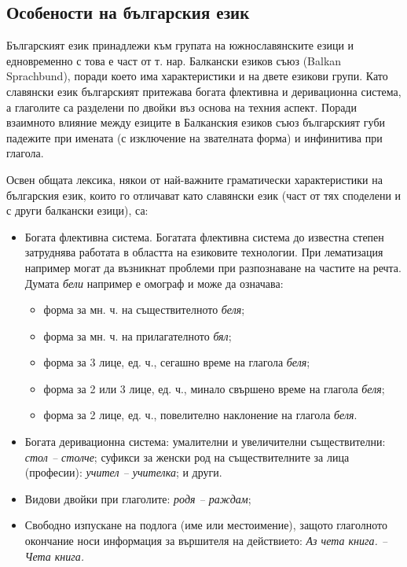\documentclass[]{../../metanetpaper}
\begin{document}
\begin{multicols}{2}
\subsection{Особености на българския език}

Българският език принадлежи към групата на южнославянските езици и едновременно с това е част от
 т. нар. Балкански езиков съюз (Balkan Sprachbund), поради което има характеристики и на двете езикови групи. Като славянски език българският притежава богата флективна и деривационна система, а глаголите са
 разделени по двойки въз основа на техния аспект. Поради взаимното влияние между езиците в Балканския езиков съюз българският губи падежите при
 имената (с изключение на звателната форма) и
 инфинитива при глагола.


Освен общата лексика, някои от най-важните граматически характеристики на българския език, които го отличават като славянски език (част от тях споделени и с други балкански езици), са:

\begin{itemize}
\item Богата флективна система. Богатата флективна система до известна степен затруднява работата в областта на
  езиковите технологии.  При лематизация например могат да възникнат
  проблеми при разпознаване на
  частите на речта. Думата \textit{бели} например е омограф и може да означава:

\begin{itemize}
\item форма за мн. ч. на съществителното \textit{беля};
\item форма за мн. ч. на прилагателното \textit{бял};
\item форма за 3 лице, ед. ч., сегашно време на глагола
 \textit{беля};
\item форма за 2 или 3 лице, ед. ч., минало свършено време
 на глагола \textit{беля};
\item форма за 2 лице, ед. ч., повелително наклонение на
 глагола \textit{беля}.
\end{itemize}

\item Богата деривационна система: умалителни и увеличителни съществителни: {\it стол -- столче}; суфикси
 за женски род на съществителните за лица (професии): {\it учител -- учителка}; и други.
\item Видови двойки при глаголите: {\it родя -- раждам};
\item Свободно изпускане на подлога (име или местоимение), защото глаголното окончание носи информация за вършителя на действието: \textit{Аз чета книга. -- Чета книга.}
\end{itemize}


\end{multicols}
\end{document}
